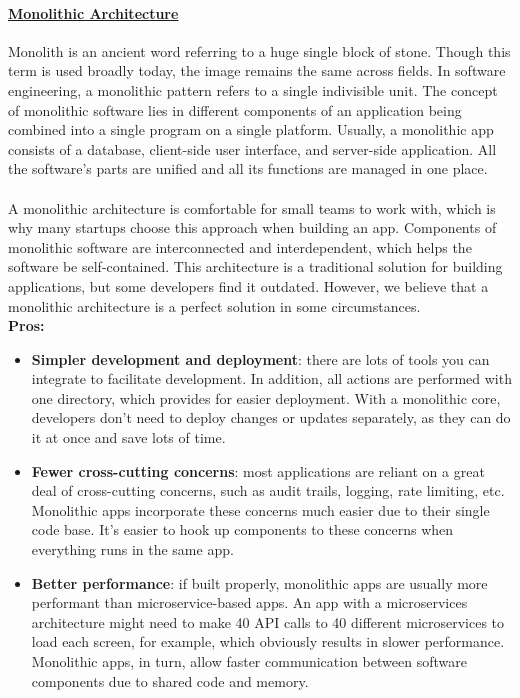 \documentclass[10pt,a4paper]{article}
\newcommand{\nline}{\\~\\}
\begin{document}
\paragraph{\uline{Monolithic Architecture}}
Monolith is an ancient word referring to a huge single block of stone. Though this term is used broadly today, the image remains the same across fields. In software engineering, a monolithic pattern refers to a single indivisible unit. The concept of monolithic software lies in different components of an application being combined into a single program on a single platform. Usually, a monolithic app consists of a database, client-side user interface, and server-side application. All the software’s parts are unified and all its functions are managed in one place.
 \nline
A monolithic architecture is comfortable for small teams to work with, which is why many startups choose this approach when building an app. Components of monolithic software are interconnected and interdependent, which helps the software be self-contained. This architecture is a traditional solution for building applications, but some developers find it outdated. However, we believe that a monolithic architecture is a perfect solution in some circumstances. \\
\textbf{Pros:}
\begin{itemize}
		\item \textbf{Simpler development and deployment}: there are lots of tools you can integrate to facilitate development. In addition, all actions are performed with one directory, which provides for easier deployment. With a monolithic core, developers don’t need to deploy changes or updates separately, as they can do it at once and save lots of time.
	\item \textbf{Fewer cross-cutting concerns}: most applications are reliant on a great deal of cross-cutting concerns, such as audit trails, logging, rate limiting, etc. Monolithic apps incorporate these concerns much easier due to their single code base. It’s easier to hook up components to these concerns when everything runs in the same app.
	\item \textbf{Better performance}: if built properly, monolithic apps are usually more performant than microservice-based apps. An app with a microservices architecture might need to make 40 API calls to 40 different microservices to load each screen, for example, which obviously results in slower performance. Monolithic apps, in turn, allow faster communication between software components due to shared code and memory.
\end{itemize}
\end{document}
